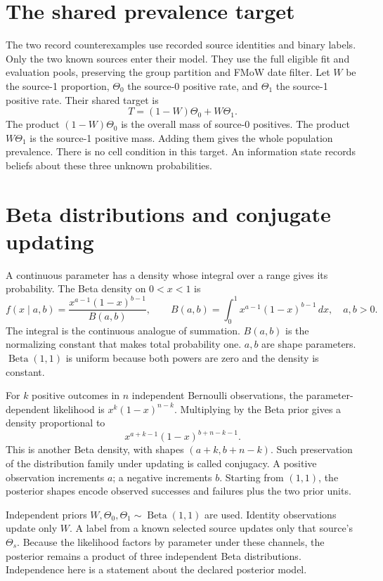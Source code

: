 \documentclass[11pt,a4paper]{report}
\newcommand{\Beta}{\operatorname{Beta}}
\begin{document}
\section{The shared prevalence target}
The two record counterexamples use recorded source identities and binary labels. Only the two known sources enter their model. They use the full eligible fit and evaluation pools, preserving the group partition and FMoW date filter. Let $W$ be the source-1 proportion, $\Theta_0$ the source-0 positive rate, and $\Theta_1$ the source-1 positive rate. Their shared target is
\begin{equation}
T=(1-W)\Theta_0+W\Theta_1.
\label{eq:beta-target}
\end{equation}
The product $(1-W)\Theta_0$ is the overall mass of source-0 positives. The product $W\Theta_1$ is the source-1 positive mass. Adding them gives the whole population prevalence. There is no cell condition in this target. An information state records beliefs about these three unknown probabilities.

\section{Beta distributions and conjugate updating}
A continuous parameter has a density whose integral over a range gives its probability. The Beta density on $0<x<1$ is
\begin{equation}
f(x\mid a,b)=\frac{x^{a-1}(1-x)^{b-1}}{B(a,b)},\qquad
B(a,b)=\int_0^1x^{a-1}(1-x)^{b-1}\,dx,
\quad a,b>0.
\end{equation}
The integral is the continuous analogue of summation. $B(a,b)$ is the normalizing constant that makes total probability one. $a,b$ are shape parameters. $\Beta(1,1)$ is uniform because both powers are zero and the density is constant.

For $k$ positive outcomes in $n$ independent Bernoulli observations, the parameter-dependent likelihood is $x^k(1-x)^{n-k}$. Multiplying by the Beta prior gives a density proportional to
\begin{equation}
x^{a+k-1}(1-x)^{b+n-k-1}.
\end{equation}
This is another Beta density, with shapes $(a+k,b+n-k)$. Such preservation of the distribution family under updating is called conjugacy. A positive observation increments $a$; a negative increments $b$. Starting from $(1,1)$, the posterior shapes encode observed successes and failures plus the two prior units.

Independent priors $W,\Theta_0,\Theta_1\sim\Beta(1,1)$ are used. Identity observations update only $W$. A label from a known selected source updates only that source's $\Theta_s$. Because the likelihood factors by parameter under these channels, the posterior remains a product of three independent Beta distributions. Independence here is a statement about the declared posterior model.
\end{document}
